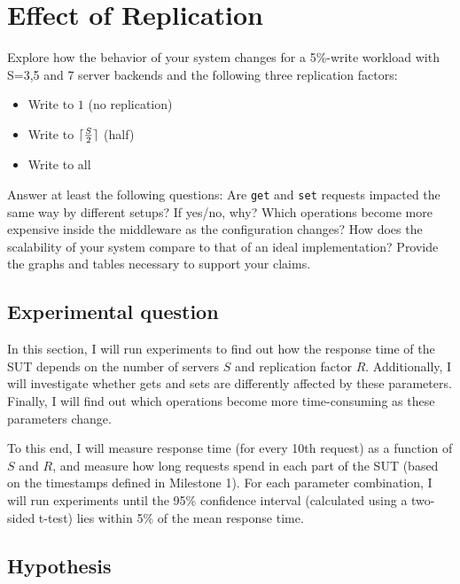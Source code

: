 \documentclass[11pt]{article}
\DeclarePairedDelimiter{\ceil}{\lceil}{\rceil}
\begin{document}
\clearpage
\section{Effect of Replication}
\label{sec:exp2}

Explore how the behavior of your system changes for a 5\%-write workload with S=3,5 and 7 server backends and the following three replication factors:
\begin{itemize} 
\item Write to $1$ (no replication) 
\item Write to $\ceil{\frac{S}{2}}$ (half) 
\item Write to all 
\end{itemize}

Answer at least the following questions: Are \texttt{get} and \texttt{set} requests impacted the same way by different setups? If yes/no, why? Which operations become more expensive inside the middleware as the configuration changes? How does the scalability of your system compare to that of an ideal implementation? Provide the graphs and tables necessary to support your claims.


\subsection{Experimental question}

In this section, I will run experiments to find out how the response time of the SUT depends on the number of servers $S$ and replication factor $R$. Additionally, I will investigate whether gets and sets are differently affected by these parameters. Finally, I will find out which operations become more time-consuming as these parameters change.

To this end, I will measure response time (for every 10th request) as a function of $S$ and $R$, and measure how long requests spend in each part of the SUT (based on the timestamps defined in Milestone 1). For each parameter combination, I will run experiments until the 95\% confidence interval (calculated using a two-sided t-test) lies within 5\% of the mean response time.

\subsection{Hypothesis}
\end{document}
